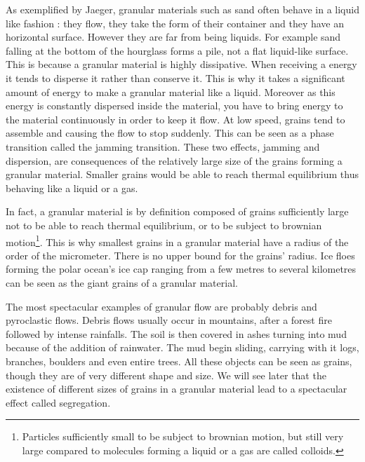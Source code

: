 \documentclass[11pt,a4paper]{report}
\begin{document}
As exemplified by Jaeger, granular materials such as sand often behave in a liquid like fashion : they flow, they take the form of their container and they have an horizontal surface. However they are far from being liquids. For example sand falling at the bottom of the hourglass forms a pile, not a flat liquid-like surface.
This is because a granular material is highly dissipative. When receiving a energy it tends to disperse it rather than conserve it. This is why it takes a significant amount of energy to make a granular material like a liquid. Moreover as this energy is constantly dispersed inside the material, you have to bring energy to the material continuously in order to keep it flow. 
At low speed, grains tend to assemble and causing the flow to stop suddenly. This can be seen as a phase transition called the jamming transition.
These two effects, jamming and dispersion, are consequences of the relatively large size of the grains forming a granular material. Smaller grains would be able to reach thermal equilibrium thus behaving like a liquid or a gas.

In fact, a granular material is by definition composed of grains sufficiently large not to be able to reach thermal equilibrium, or to be subject to brownian motion\footnote{Particles sufficiently small to be subject to brownian motion, but still very large compared to molecules forming a liquid or a gas are called colloids.}.
This is why smallest grains in a granular material have a radius of the order of the micrometer.
There is no upper bound for the grains' radius. Ice floes forming the polar ocean's ice cap ranging from a few metres to several kilometres can be seen as the giant grains of a granular material.

The most spectacular examples of granular flow are probably debris and pyroclastic flows.
Debris flows usually occur in mountains, after a forest fire followed by intense rainfalls. The soil is then covered in ashes turning into mud because of the addition of rainwater. The mud begin sliding, carrying with it logs, branches, boulders and even entire trees. All these objects can be seen as grains, though they are of very different shape and size. We will see later that the existence of different sizes of grains in a granular material lead to a spectacular effect called segregation.
\end{document}
